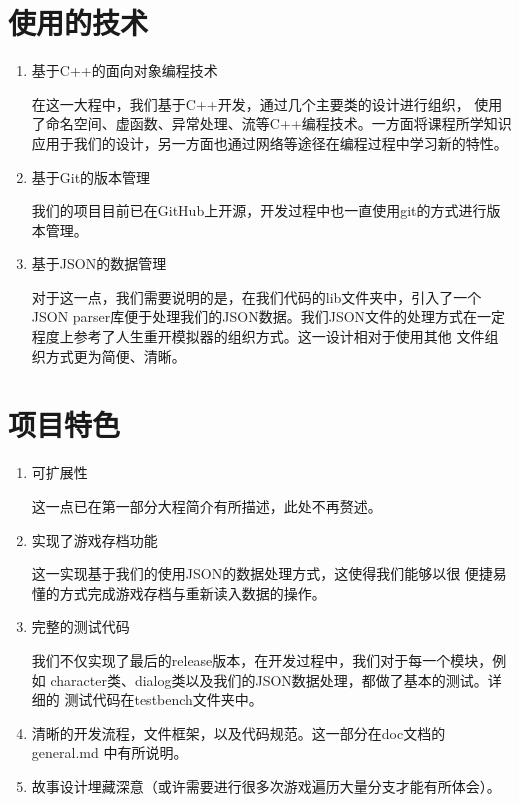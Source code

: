 \documentclass[UTF8]{ctexart}
\begin{document}
    \section{使用的技术}
    \begin{enumerate}
        \item 基于C++的面向对象编程技术
        
        在这一大程中，我们基于C++开发，通过几个主要类的设计进行组织，
        使用了命名空间、虚函数、异常处理、流等C++编程技术。一方面将课程所学知识
        应用于我们的设计，另一方面也通过网络等途径在编程过程中学习新的特性。
        \item 基于Git的版本管理
        
        我们的项目目前已在GitHub上开源，开发过程中也一直使用git的方式进行版本管理。
        \item 基于JSON的数据管理
        
        对于这一点，我们需要说明的是，在我们代码的lib文件夹中，引入了一个
        JSON parser库便于处理我们的JSON数据。我们JSON文件的处理方式在一定
        程度上参考了人生重开模拟器的组织方式。这一设计相对于使用其他
        文件组织方式更为简便、清晰。
    \end{enumerate}

    \section{项目特色}
    \begin{enumerate}
        \item 可扩展性
        
        这一点已在第一部分大程简介有所描述，此处不再赘述。
        \item 实现了游戏存档功能
        
        这一实现基于我们的使用JSON的数据处理方式，这使得我们能够以很
        便捷易懂的方式完成游戏存档与重新读入数据的操作。

        \item 完整的测试代码
        
        我们不仅实现了最后的release版本，在开发过程中，我们对于每一个模块，例如
        character类、dialog类以及我们的JSON数据处理，都做了基本的测试。详细的
        测试代码在testbench文件夹中。

        \item 清晰的开发流程，文件框架，以及代码规范。这一部分在doc文档的general.md
        中有所说明。

        \item 故事设计埋藏深意（或许需要进行很多次游戏遍历大量分支才能有所体会）。
    \end{enumerate}
\end{document}
